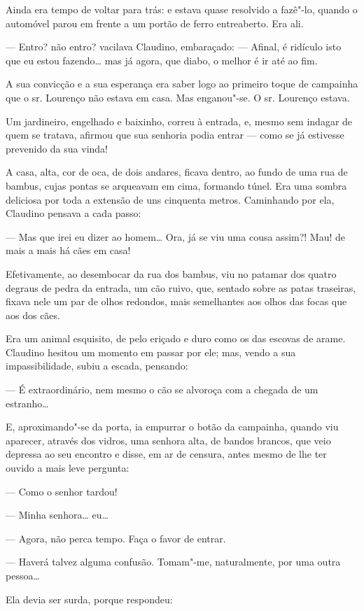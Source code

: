 Ainda era tempo de voltar para trás: e estava quase resolvido a fazê"-lo,
quando o automóvel parou em frente a um portão de ferro entreaberto. Era
ali.

--- Entro? não entro? vacilava Claudino, embaraçado: --- Afinal, é
ridículo isto que eu estou fazendo\ldots{} mas já agora, que diabo, o melhor
é ir até ao fim.

A sua convicção e a sua esperança era saber logo ao primeiro toque de
campainha que o sr. Lourenço não estava em casa. Mas enganou"-se. O sr.
Lourenço estava.

Um jardineiro, engelhado e baixinho, correu à entrada, e, mesmo sem
indagar de quem se tratava, afirmou que sua senhoria podia entrar ---
como se já estivesse prevenido da sua vinda!

A casa, alta, cor de oca, de dois andares, ficava dentro, ao fundo de
uma rua de bambus, cujas pontas se arqueavam em cima, formando túnel.
Era uma sombra deliciosa por toda a extensão de uns cinquenta metros.
Caminhando por ela, Claudino pensava a cada passo:

--- Mas que irei eu dizer ao homem\ldots{} Ora, já se viu uma cousa assim?!
Mau! de mais a mais há cães em casa!

Efetivamente, ao desembocar da rua dos bambus, viu no patamar dos quatro
degraus de pedra da entrada, um cão ruivo, que, sentado sobre as patas
traseiras, fixava nele um par de olhos redondos, mais semelhantes aos
olhos das focas que aos dos cães.

Era um animal esquisito, de pelo eriçado e duro como os das escovas de
arame. Claudino hesitou um momento em passar por ele; mas, vendo a sua
impassibilidade, subiu a escada, pensando:

--- É extraordinário, nem mesmo o cão se alvoroça com a chegada de um
estranho\ldots{}

E, aproximando"-se da porta, ia empurrar o botão da campainha, quando viu
aparecer, através dos vidros, uma senhora alta, de bandos brancos, que
veio depressa ao seu encontro e disse, em ar de censura, antes mesmo de
lhe ter ouvido a mais leve pergunta:

--- Como o senhor tardou!

--- Minha senhora\ldots{} eu\ldots{}

--- Agora, não perca tempo. Faça o favor de entrar.

--- Haverá talvez alguma confusão. Tomam"-me, naturalmente, por uma outra
pessoa\ldots{}

Ela devia ser surda, porque respondeu:

